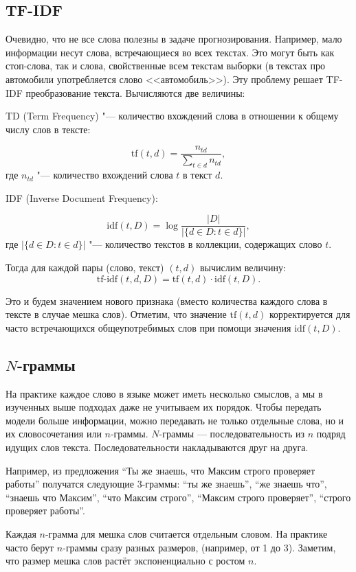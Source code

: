 \documentclass[12pt,fleqn]{article}
\begin{document}
\subsection{TF-IDF}

Очевидно, что не все слова полезны в задаче прогнозирования. Например, мало информации несут слова, встречающиеся во всех текстах. Это могут быть как стоп-слова, так и слова, свойственные всем текстам выборки (в текстах про автомобили употребляется слово <<автомобиль>>). Эту проблему решает TF-IDF преобразование текста. Вычисляются две величины:

TD (Term Frequency) "--- количество вхождений слова в отношении к общему числу слов в тексте:

$$\text{tf}(t, d) = \frac{n_{td}}{\sum_{t \in d} n_{td}},$$
где $n_{td}$ "--- количество вхождений слова $t$ в текст $d$.

IDF (Inverse Document Frequency):

$$\text{idf}(t, D) = \log \frac{\left| D \right|}{\left| \{d\in D: t \in d\} \right|},$$
где $\left| \{d\in D: t \in d\} \right|$ "--- количество текстов в коллекции, содержащих слово $t$.

Тогда для каждой пары (слово, текст) $(t, d)$ вычислим величину:
$$\text{tf-idf}(t,d, D) = \text{tf}(t, d)\cdot \text{idf}(t, D).$$

Это и будем значением нового признака (вместо количества каждого слова в тексте в случае мешка слов). Отметим, что значение $\text{tf}(t, d)$ корректируется для часто встречающихся общеупотребимых слов при помощи значения $\text{idf}(t, D).$

\subsection{$N$-граммы}

На практике каждое слово в языке может иметь несколько смыслов, а мы в изученных выше подходах даже не учитываем их порядок. Чтобы передать модели больше информации, можно передавать не только отдельные слова, но и их словосочетания или $n$-граммы. $N$-граммы --- последовательность из $n$ подряд идущих слов текста. Последовательности накладываются друг на друга.

Например, из предложения ``Ты же знаешь, что Максим строго проверяет работы'' получатся следующие 3-граммы: ``ты же знаешь'', ``же знаешь что'', ``знаешь что Максим'', ``что Максим строго'', ``Максим строго проверяет'', ``строго проверяет работы''.

Каждая $n$-грамма для мешка слов считается отдельным словом. На практике часто берут $n$-граммы сразу разных размеров, (например, от 1 до 3). Заметим, что размер мешка слов растёт экспоненциально с ростом $n$.
\end{document}
